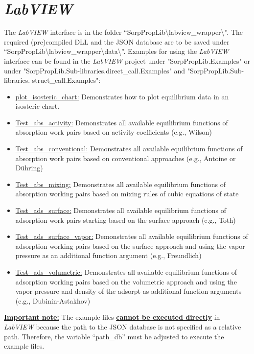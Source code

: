 \section{\textit{LabVIEW}}
\label{cha:usage:labview}
%
The \textit{LabVIEW} interface is in the folder “SorpPropLib\textbackslash labview\_wrapper\textbackslash ”. The required (pre)compiled DLL and the JSON database are to be saved under “SorpPropLib\textbackslash labview\_wrapper\textbackslash data\textbackslash”. Examples for using the \textit{LabVIEW} interface can be found in the \textit{LabVIEW} project under "SorpPropLib.Examples" or under "SorpPropLib.Sub-libraries.direct\_call.Examples" and "SorpPropLib.Sub-libraries. struct\_call.Examples":
\begin{itemize}
	\item \underline{plot\_isosteric\_chart:} Demonstrates how to plot equilibrium data in an isosteric chart.
	\item \underline{Test\_abs\_activity:} Demonstrates all available equilibrium functions of absorption work pairs based on activity coefficients (e.g., Wilson)
	\item \underline{Test\_abs\_conventional:} Demonstrates all available equilibrium functions of absorption work pairs based on conventional approaches (e.g., Antoine or Dühring)
	\item \underline{Test\_abs\_mixing:} Demonstrates all available equilibrium functions of absorption working pairs based on mixing rules of cubic equations of state
	\item \underline{Test\_ads\_surface:} Demonstrates all available equilibrium functions of adsorption work pairs starting based on the surface approach (e.g., Toth)
	\item \underline{Test\_ads\_surface\_vapor:} Demonstrates all available equilibrium functions of adsorption working pairs based on the surface approach and using the vapor pressure as an additional function argument (e.g., Freundlich)
	\item \underline{Test\_ads\_volumetric:} Demonstrates all available equilibrium functions of adsorption working pairs based on the volumetric approach and using the vapor pressure and density of the adsorpt as additional function arguments (e.g., Dubinin-Astakhov)
\end{itemize}
\textbf{\underline{Important note:}} The example files \textbf{\underline{cannot be executed directly}} in \textit{LabVIEW} because the path to the JSON database is not specified as a relative path. Therefore, the variable “path\_db” must be adjusted to execute the example files.

